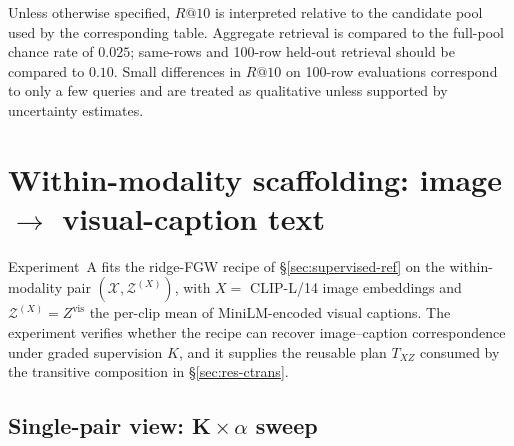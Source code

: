 Unless otherwise specified, $R@10$ is interpreted relative to the
candidate pool used by the corresponding table. Aggregate retrieval is
compared to the full-pool chance rate of $0.025$; same-rows and
100-row held-out retrieval should be compared to $0.10$. Small
differences in $R@10$ on 100-row evaluations correspond to only a few
queries and are treated as qualitative unless supported by uncertainty
estimates.


\section{Within-modality scaffolding: image $\to$ visual-caption text}
\label{sec:res-a}

Experiment~A fits the ridge-FGW recipe of
\S\ref{sec:supervised-ref} on the within-modality pair
$(\mathcal{X}, \mathcal{Z}^{(X)})$, with $X=$ CLIP-L/14 image
embeddings and $\mathcal{Z}^{(X)}=Z^{\text{vis}}$ the per-clip mean of
MiniLM-encoded visual captions. The experiment verifies whether the
recipe can recover image--caption correspondence under graded
supervision $K$, and it supplies the reusable plan $T_{X\!Z}$ consumed
by the transitive composition in \S\ref{sec:res-ctrans}.

\subsection{Single-pair view: K\,$\times$\,$\alpha$ sweep}



